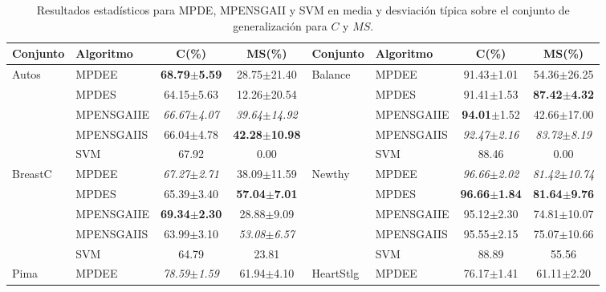 \begin{table}[!htb]
\tiny
\caption{Resultados estadísticos para MPDE, MPENSGAII y SVM en media y desviación típica
sobre el conjunto de generalización para $C$ y $MS$.}
\label{tabla2MPDE}
\centering
\tabcolsep 2pt
\renewcommand{\arraystretch}{1.2}
\begin{tabular}{llccllcc}
\hline
\rowcolor[rgb]{0.70,0.85,1}\textbf{Conjunto} & \textbf{Algoritmo} & \textbf{C(\%)} &
\textbf{MS(\%)} & \textbf{Conjunto} & \textbf{Algoritmo} & \textbf{C(\%)} &
\textbf{MS(\%)} \\ \hline
\rowcolor[rgb]{0.86,0.94,1}Autos & MPDEE & \textbf{68.79$\pm$5.59} & 28.75$\pm$21.40 &
Balance & MPDEE & 91.43$\pm$1.01 & 54.36$\pm$26.25 \\
\rowcolor[rgb]{0.86,0.94,1}& MPDES & 64.15\textit{$\pm$}5.63 &
12.26\textit{$\pm$}20.54\textbf{} &  & MPDES & 91.41$\pm$1.53 & \textbf{87.42$\pm$4.32}
\\
\rowcolor[rgb]{0.86,0.94,1}& MPENSGAIIE & \textit{66.67$\pm$4.07} &
\textit{39.64$\pm$14.92} &  & MPENSGAIIE & \textbf{94.01}$\pm$1.52\textbf{} &
42.66$\pm$17.00 \\
\rowcolor[rgb]{0.86,0.94,1}& MPENSGAIIS & 66.04\textit{$\pm$}4.78\textbf{\textit{}} &
\textbf{42.28\textit{$\pm$}10.98}\textit{\underbar{}} &  & MPENSGAIIS &
\textit{92.47$\pm$2.16} & \textit{83.72$\pm$8.19} \\
\rowcolor[rgb]{0.86,0.94,1}& SVM & 67.92 & 0.00 &  & SVM & 88.46 & 0.00 \\ \hline
\rowcolor[rgb]{0.86,0.94,1}BreastC & MPDEE & \textit{67.27$\pm$2.71} & 38.09$\pm$11.59 &
Newthy & MPDEE & \textit{96.66$\pm$2.02} & \textit{81.42$\pm$10.74} \\
\rowcolor[rgb]{0.86,0.94,1} & MPDES & 65.39$\pm$3.40\textbf{} & \textbf{57.04$\pm$7.01} &
& MPDES & \textbf{96.66$\pm$1.84} & \textbf{81.64$\pm$9.76} \\
\rowcolor[rgb]{0.86,0.94,1}& MPENSGAIIE & \textbf{69.34$\pm$2.30} & 28.88$\pm$9.09 &  &
MPENSGAIIE & 95.12$\pm$2.30\textbf{} & 74.81$\pm$10.07 \\
\rowcolor[rgb]{0.86,0.94,1} & MPENSGAIIS & 63.99$\pm$3.10 & \textit{53.08$\pm$6.57} &  &
MPENSGAIIS & 95.55$\pm$2.15 & 75.07$\pm$10.66\textit{} \\
\rowcolor[rgb]{0.86,0.94,1}& SVM & 64.79 & 23.81 &  & SVM & 88.89 & 55.56 \\ \hline
\rowcolor[rgb]{0.86,0.94,1}Pima & MPDEE & \textit{78.59$\pm$1.59} & 61.94$\pm$4.10 &
HeartStlg & MPDEE & 76.17$\pm$1.41 & 61.11$\pm$2.20 \\

\end{tabular}
\end{table}
